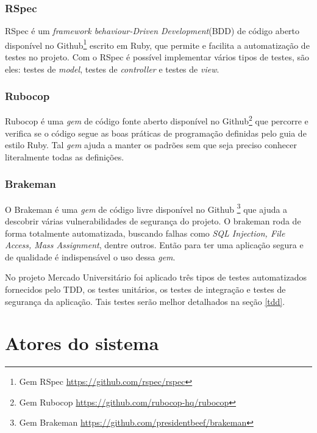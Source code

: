 \subsubsection{RSpec}\label{rspec}
RSpec é um \textit{framework behaviour-Driven Development}(BDD) de código aberto disponível no Github\footnote{Gem RSpec \url{https://github.com/rspec/rspec}} escrito em Ruby, que permite e facilita a automatização de testes no projeto. Com o RSpec é possível implementar vários tipos de testes, são eles: testes de \textit{model}, testes de \textit{controller} e testes de \textit{view}.
\subsubsection{Rubocop}\label{rubocop}
Rubocop é uma \textit{gem} de código fonte aberto disponível no Github\footnote{Gem Rubocop \url{https://github.com/rubocop-hq/rubocop}} que percorre e verifica se o código segue as boas práticas de programação definidas pelo guia de estilo Ruby. Tal \textit{gem} ajuda a manter os padrões sem que seja preciso conhecer literalmente todas as definições.
\subsubsection{Brakeman}\label{brakeman}
O Brakeman é uma \textit{gem} de código livre disponível no Github \footnote{Gem Brakeman \url{https://github.com/presidentbeef/brakeman}} que ajuda a descobrir várias vulnerabilidades de segurança do projeto. O brakeman roda de forma totalmente automatizada, buscando falhas como \textit{SQL Injection, File Access, Mass Assignment}, dentre outros. Então para ter uma aplicação segura e de qualidade é indispensável o uso dessa \textit{gem}.

No projeto Mercado Universitário foi aplicado três tipos de testes automatizados fornecidos pelo TDD, os testes unitários, os testes de integração e testes de segurança da aplicação. Tais testes serão melhor detalhados na seção \ref{tdd}.

\section{Atores do sistema}

